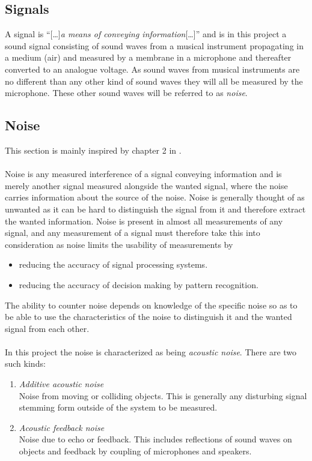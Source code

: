 \subsection{Signals}
A signal is ``[\dots]\textit{a means of conveying information}[\dots]'' \cite{signal_noise} and is in this project a sound signal consisting of sound waves from a musical instrument propagating in a medium (air) and measured by a membrane in a microphone and thereafter converted to an analogue voltage. As sound waves from musical instruments are no different than any other kind of sound waves they will all be measured by the microphone. These other sound waves will be referred to as \textit{noise}.

\subsection{Noise}
This section is mainly inspired by chapter 2 in \cite{signal_noise}. \\ \\
Noise is any measured interference of a signal conveying information and is merely another signal measured alongside the wanted signal, where the noise carries information about the source of the noise.  Noise is generally thought of as unwanted as it can be hard to distinguish the signal from it and therefore extract the wanted information. Noise is present in almost all measurements of any signal, and any measurement of a signal must therefore take this into consideration as noise limits the usability of measurements by
\begin{itemize}
\item reducing the accuracy of signal processing systems.
\item reducing the accuracy of decision making by pattern recognition.
\end{itemize}
The ability to counter noise depends on knowledge of the specific noise so as to be able to use the characteristics of the noise to distinguish it and the wanted signal from each other.
\\ \\
In this project the noise is characterized as being \textit{acoustic noise}. There are two such kinds:
\begin{enumerate}
\item \textit{Additive acoustic noise} \\
Noise from moving or colliding objects. This is generally any disturbing signal stemming form outside of the system to be measured.
\item \textit{Acoustic feedback noise} \\
Noise due to echo or feedback. This includes reflections of sound waves on objects and feedback by coupling of microphones and speakers.
\end{enumerate}

